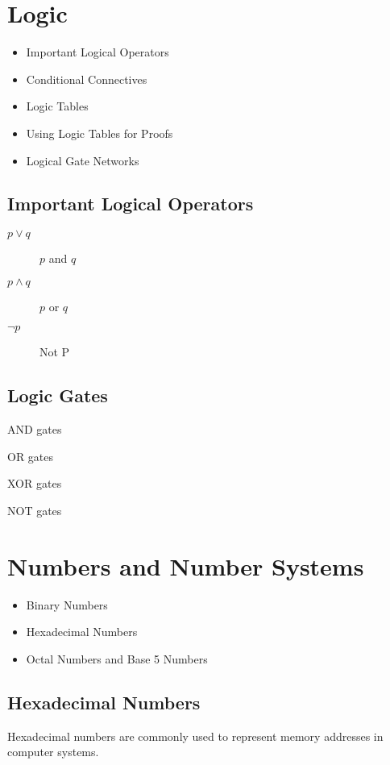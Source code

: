 \section{Logic}
\begin{itemize}
\item Important Logical Operators
\item Conditional Connectives
\item Logic Tables
\item Using Logic Tables for Proofs
\item Logical Gate Networks
\end{itemize}



\subsection*{Important Logical Operators}

\begin{description}
\item[$p \vee q$] $p$ and $q$
\item[$p \wedge q$] $p$ or $q$
\item[$\neg p$] Not P
\end{description}


\subsection*{Logic Gates}

\begin{description}
\item AND gates
\item OR gates
\item XOR gates
\item NOT gates
\end{description}
\newpage
\section{Numbers and Number Systems}
\begin{itemize}
\item Binary Numbers
\item Hexadecimal Numbers
\item Octal Numbers and Base 5 Numbers
\end{itemize}

\subsection*{Hexadecimal Numbers}
Hexadecimal numbers are commonly used to represent memory addresses in computer systems.
 

